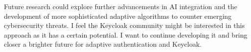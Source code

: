 Future research could explore further advancements in AI integration and the development of more sophisticated adaptive algorithms to counter emerging cybersecurity threats.
I feel the Keycloak community might be interested in this approach as it has a certain potential.
I want to continue developing it and bring closer a brighter future for adaptive authentication and Keycloak.